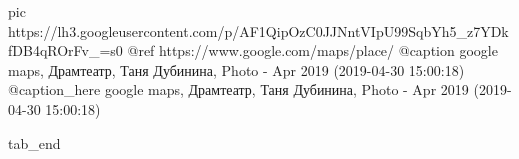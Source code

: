      pic https://lh3.googleusercontent.com/p/AF1QipOzC0JJNntVIpU99SqbYh5_z7YDkfDB4qROrFv_=s0
     @ref https://www.google.com/maps/place/%
     @caption google maps, Драмтеатр, Таня Дубинина, Photo - Apr 2019 (2019-04-30 15:00:18)
     @caption_here google maps, Драмтеатр, Таня Дубинина, Photo - Apr 2019 (2019-04-30 15:00:18)

  tab_end
\fi



